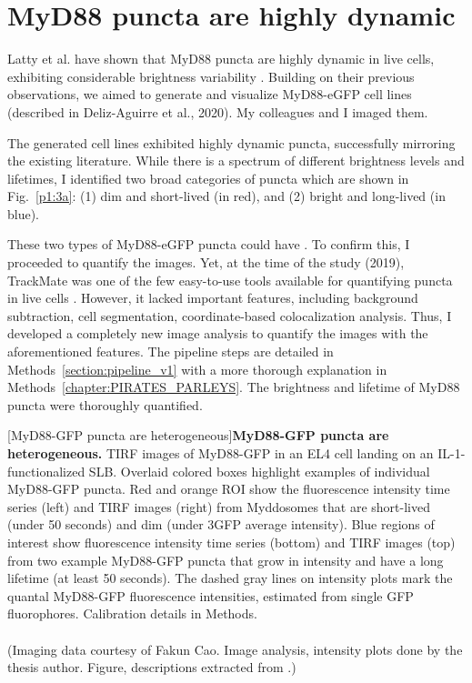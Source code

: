 \section{MyD88 puncta are highly dynamic}
Latty et al. have shown that MyD88 puncta are highly dynamic in live cells, exhibiting considerable brightness variability \autocite{Latty_2018}. Building on their previous observations, we aimed to generate and visualize MyD88-eGFP cell lines (described in Deliz-Aguirre et al., 2020). My colleagues and I imaged them.

The generated cell lines exhibited highly dynamic puncta, successfully mirroring the existing literature. While there is a spectrum of different brightness levels and lifetimes, I identified two broad categories of puncta which are shown in Fig.~\ref{p1:3a}: (1) dim and short-lived (in red), and (2) bright and long-lived (in blue).

These two types of MyD88-eGFP puncta could have . To confirm this, I proceeded to quantify the images. Yet, at the time of the study (2019), TrackMate was one of the few easy-to-use tools available for quantifying puncta in live cells \autocite{Tinevez_2017}. However, it lacked important features, including background subtraction, cell segmentation, coordinate-based colocalization analysis. Thus, I developed a completely new image analysis to quantify the images with the aforementioned features. The pipeline steps are detailed in Methods~\ref{section:pipeline_v1} with a more thorough explanation in Methods~\ref{chapter:PIRATES_PARLEYS}. The brightness and lifetime of MyD88 puncta were thoroughly quantified.


\begin{centering}
\captionsetup{parbox=none}
[MyD88-GFP puncta are heterogeneous]{\textbf{MyD88-GFP puncta are heterogeneous.} TIRF images of MyD88-GFP in an EL4 cell landing on an IL-1{\textbeta}-functionalized SLB. Overlaid colored boxes highlight examples of individual MyD88-GFP puncta. Red and orange ROI show the fluorescence intensity time series (left) and TIRF images (right) from Myddosomes that are short-lived (under 50 seconds) and dim (under 3\times GFP average intensity). Blue regions of interest show fluorescence intensity time series (bottom) and TIRF images (top) from two example MyD88-GFP puncta that grow in intensity and have a long lifetime (at least 50 seconds). The dashed gray lines on intensity plots mark the quantal MyD88-GFP fluorescence intensities, estimated from single GFP fluorophores. Calibration details in Methods.
\\
\\
(Imaging data courtesy of Fakun Cao. Image analysis, intensity plots done by the thesis author. Figure, descriptions extracted from \autocite{Deliz-Aguirre_2021}.)}
\label{p1:3a}
\end{centering}

